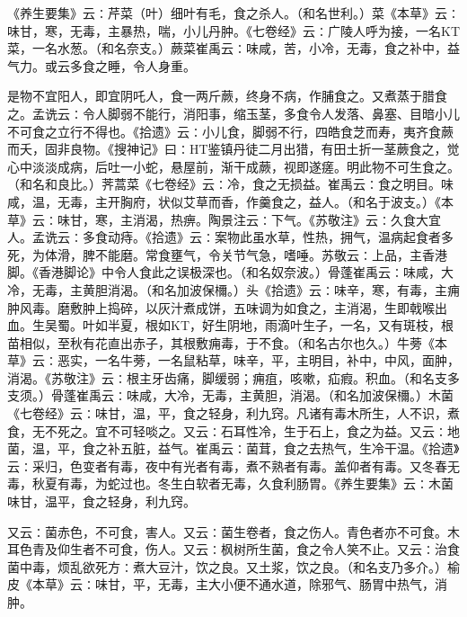 \documentclass[a4paper,12pt,UTF8,twoside]{ctexbook}
\begin{document}
《养生要集》云∶芹菜（叶）细叶有毛，食之杀人。（和名世利。）菜《本草》云∶味甘，寒，无毒，主暴热，喘，小儿丹肿。《七卷经》云∶广陵人呼为接，一名KT菜，一名水葱。（和名奈支。）蕨菜崔禹云∶味咸，苦，小冷，无毒，食之补中，益气力。或云多食之睡，令人身重。

是物不宜阳人，即宜阴吒人，食一两斤蕨，终身不病，作脯食之。又煮蒸于腊食之。孟诜云∶令人脚弱不能行，消阳事，缩玉茎，多食令人发落、鼻塞、目暗小儿不可食之立行不得也。《拾遗》云∶小儿食，脚弱不行，四皓食芝而寿，夷齐食蕨而夭，固非良物。《搜神记》曰∶HT鉴镇丹徒二月出猎，有田土折一茎蕨食之，觉心中淡淡成病，后吐一小蛇，悬屋前，渐干成蕨，视即遂瘥。明此物不可生食之。（和名和良比。）荠蒿菜《七卷经》云∶冷，食之无损益。崔禹云∶食之明目。味咸，温，无毒，主开胸府，状似艾草而香，作羹食之，益人。（和名于波支。）《本草》云∶味甘，寒，主消渴，热痹。陶景注云∶下气。《苏敬注》云∶久食大宜人。孟诜云∶多食动痔。《拾遗》云∶案物此虽水草，性热，拥气，温病起食者多死，为体滑，脾不能磨。常食壅气，令关节气急，嗜唾。苏敬云∶上品，主香港脚。《香港脚论》中令人食此之误极深也。（和名奴奈波。）骨蓬崔禹云∶味咸，大冷，无毒，主黄胆消渴。（和名加波保檷。）头《拾遗》云∶味辛，寒，有毒，主痈肿风毒。磨敷肿上捣碎，以灰汁煮成饼，五味调为如食之，主消渴，生即戟喉出血。生吴蜀。叶如半夏，根如KT，好生阴地，雨滴叶生子，一名，又有斑枝，根苗相似，至秋有花直出赤子，其根敷痈毒，于不食。（和名古尔也久。）牛蒡《本草》云∶恶实，一名牛蒡，一名鼠粘草，味辛，平，主明目，补中，中风，面肿，消渴。《苏敬注》云∶根主牙齿痛，脚缓弱；痈疽，咳嗽，疝瘕。积血。（和名支多支须。）骨蓬崔禹云∶味咸，大冷，无毒，主黄胆，消渴。（和名加波保檷。）木菌《七卷经》云∶味甘，温，平，食之轻身，利九窍。凡诸有毒木所生，人不识，煮食，无不死之。宜不可轻啖之。又云∶石耳性冷，生于石上，食之为益。又云∶地菌，温，平，食之补五脏，益气。崔禹云∶菌茸，食之去热气，生冷干温。《拾遗》云∶采归，色变者有毒，夜中有光者有毒，煮不熟者有毒。盖仰者有毒。又冬春无毒，秋夏有毒，为蛇过也。冬生白软者无毒，久食利肠胃。《养生要集》云∶木菌味甘，温平，食之轻身，利九窍。

又云∶菌赤色，不可食，害人。又云∶菌生卷者，食之伤人。青色者亦不可食。木耳色青及仰生者不可食，伤人。又云∶枫树所生菌，食之令人笑不止。又云∶治食菌中毒，烦乱欲死方∶煮大豆汁，饮之良。又土浆，饮之良。（和名支乃多介。）榆皮《本草》云∶味甘，平，无毒，主大小便不通水道，除邪气、肠胃中热气，消肿。
\end{document}
